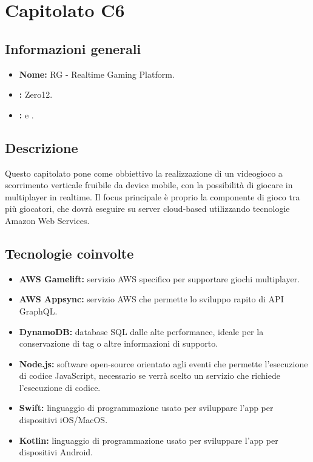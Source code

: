 \section{Capitolato C6}

\subsection{Informazioni generali}
\begin{itemize}
\item \textbf{Nome:} RG - Realtime Gaming Platform.
\item \textbf{\commitProg:} Zero12.
\item \textbf{\proponProg:} \VT{} e \CR.
\end{itemize}

\subsection{Descrizione}
Questo capitolato pone come obbiettivo la realizzazione di un videogioco a scorrimento verticale fruibile da device mobile, con la possibilità di giocare in multiplayer in realtime. Il focus principale è proprio la componente di gioco tra più giocatori, che dovrà eseguire su server cloud-based utilizzando tecnologie Amazon Web Services.

\subsection{Tecnologie coinvolte}
\begin{itemize}
\item \textbf{AWS Gamelift:} servizio AWS specifico per supportare giochi multiplayer.
\item \textbf{AWS Appsync:} servizio AWS che permette lo sviluppo rapito di API GraphQL.
\item \textbf{DynamoDB:} database SQL dalle alte performance, ideale per la conservazione di tag o altre informazioni di supporto.
\item \textbf{Node.js:} software open-source orientato agli eventi che permette l'esecuzione di codice JavaScript, necessario se verrà scelto un servizio che richiede l'esecuzione di codice.
\item \textbf{Swift:} linguaggio di programmazione usato per sviluppare l'app per dispositivi iOS/MacOS.
\item \textbf{Kotlin:} linguaggio di programmazione usato per sviluppare l'app per dispositivi Android.
\end{itemize}


